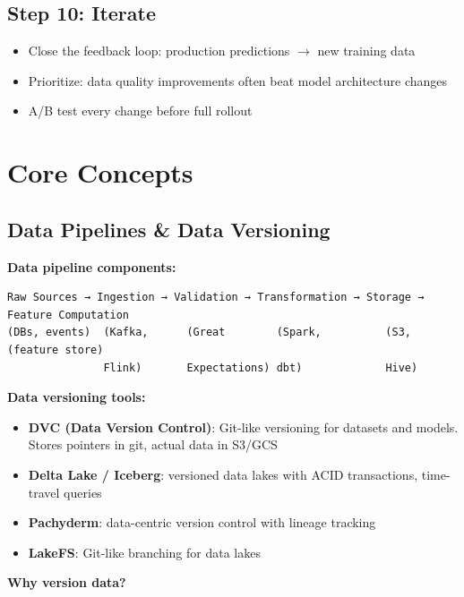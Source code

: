 \documentclass[11pt]{article}
\providecommand{\tightlist}{\setlength{\itemsep}{1pt}\setlength{\parskip}{0pt}}
\begin{document}
\subsection{Step 10: Iterate}\label{step-10-iterate}

\begin{itemize}
\tightlist
\item
  Close the feedback loop: production predictions \(\rightarrow\) new training data
\item
  Prioritize: data quality improvements often beat model architecture changes
\item
  A/B test every change before full rollout
\end{itemize}

\section{Core Concepts}\label{core-concepts}

\subsection{Data Pipelines \& Data Versioning}\label{data-pipelines--data-versioning}

\textbf{Data pipeline components:}

\setcodelang{}

\begin{verbatim}
Raw Sources → Ingestion → Validation → Transformation → Storage → Feature Computation
(DBs, events)  (Kafka,      (Great        (Spark,          (S3,       (feature store)
               Flink)       Expectations) dbt)             Hive)
\end{verbatim}

\textbf{Data versioning tools:}

\begin{itemize}
\tightlist
\item
  \textbf{DVC (Data Version Control)}: Git-like versioning for datasets and models. Stores pointers in git, actual data in S3/GCS
\item
  \textbf{Delta Lake / Iceberg}: versioned data lakes with ACID transactions, time-travel queries
\item
  \textbf{Pachyderm}: data-centric version control with lineage tracking
\item
  \textbf{LakeFS}: Git-like branching for data lakes
\end{itemize}

\textbf{Why version data?}
\end{document}
